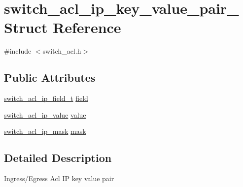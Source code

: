 \hypertarget{structswitch__acl__ip__key__value__pair__}{\section{switch\+\_\+acl\+\_\+ip\+\_\+key\+\_\+value\+\_\+pair\+\_\+ Struct Reference}
\label{structswitch__acl__ip__key__value__pair__}
}


{\ttfamily \#include $<$switch\+\_\+acl.\+h$>$}

\subsection*{Public Attributes}
\begin{DoxyCompactItemize}
\item 
\hyperlink{group__ACL_gace0502c1033d71f9f41503531d259a19}{switch\+\_\+acl\+\_\+ip\+\_\+field\+\_\+t} \hyperlink{structswitch__acl__ip__key__value__pair___a1ee520ef81f1bc45fa68576fd3a04fe2}{field}
\item 
\hyperlink{group__ACL_ga6a198102b6c0fc0043f5486f85870dfa}{switch\+\_\+acl\+\_\+ip\+\_\+value} \hyperlink{structswitch__acl__ip__key__value__pair___a9b5bde3e75594542c21441ac4c7fd1a6}{value}
\item 
\hyperlink{group__ACL_ga1a194b7137a5eebe4941a321815f4263}{switch\+\_\+acl\+\_\+ip\+\_\+mask} \hyperlink{structswitch__acl__ip__key__value__pair___a6c4f85b232dd2d767d4cf87a76af3fdb}{mask}
\end{DoxyCompactItemize}


\subsection{Detailed Description}
Ingress/\+Egress Acl I\+P key value pair 

